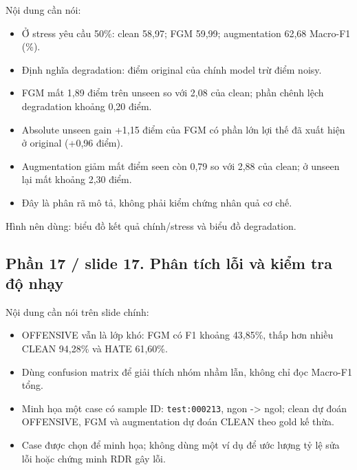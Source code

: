 \documentclass[11pt,a4paper]{article}
\begin{document}
Nội dung cần nói:


\begin{itemize}

\item Ở stress yêu cầu 50\%: clean 58,97; FGM 59,99; augmentation 62,68 Macro-F1 (\%).

\item Định nghĩa degradation: điểm original của chính model trừ điểm noisy.

\item FGM mất 1,89 điểm trên unseen so với 2,08 của clean; phần chênh lệch degradation khoảng 0,20 điểm.

\item Absolute unseen gain +1,15 điểm của FGM có phần lớn lợi thế đã xuất hiện ở original (+0,96 điểm).

\item Augmentation giảm mất điểm seen còn 0,79 so với 2,88 của clean; ở unseen lại mất khoảng 2,30 điểm.

\item Đây là phân rã mô tả, không phải kiểm chứng nhân quả cơ chế.

\end{itemize}

Hình nên dùng: biểu đồ kết quả chính/stress và biểu đồ degradation.


\subsection*{Phần 17 / slide 17. Phân tích lỗi và kiểm tra độ nhạy}

Nội dung cần nói trên slide chính:


\begin{itemize}

\item OFFENSIVE vẫn là lớp khó: FGM có F1 khoảng 43,85\%, thấp hơn nhiều CLEAN 94,28\% và HATE 61,60\%.

\item Dùng confusion matrix để giải thích nhóm nhầm lẫn, không chỉ đọc Macro-F1 tổng.

\item Minh họa một case có sample ID: \texttt{test:000213}, ngon -> ngol; clean dự đoán OFFENSIVE, FGM và augmentation dự đoán CLEAN theo gold kế thừa.

\item Case được chọn để minh họa; không dùng một ví dụ để ước lượng tỷ lệ sửa lỗi hoặc chứng minh RDR gây lỗi.

\end{itemize}
\end{document}
